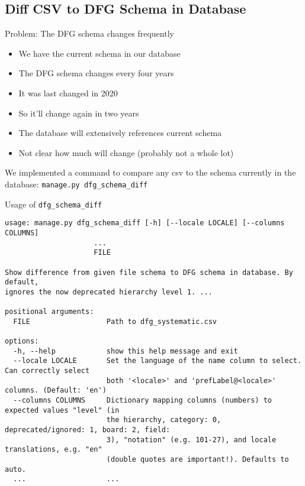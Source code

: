 \subsection{Diff CSV to DFG Schema in Database}

\begin{frame}[c]{Problem: The DFG schema changes frequently}
    \large
    \begin{itemize}[<+(1)->]
        \item We have the current schema in our database
        \item The DFG schema changes every four years
        \item It was last changed in 2020
        \item So it'll change again in two years
        \item The database will extensively references current schema
        \item Not clear how much will change (probably not a whole lot)
    \end{itemize}
    \pause
    We implemented a command to compare any csv to the schema currently in the
    database: \texttt{manage.py dfg_schema_diff}
\end{frame}


\begin{frame}[fragile]{Usage of \texttt{dfg\_schema\_diff}}
    \scriptsize
\begin{verbatim}
usage: manage.py dfg_schema_diff [-h] [--locale LOCALE] [--columns COLUMNS]
                     ...
                     FILE

Show difference from given file schema to DFG schema in database. By default,
ignores the now deprecated hierarchy level 1. ...

positional arguments:
  FILE                  Path to dfg_systematic.csv

options:
  -h, --help            show this help message and exit
  --locale LOCALE       Set the language of the name column to select. Can correctly select
                        both '<locale>' and 'prefLabel@<locale>' columns. (Default: 'en')
  --columns COLUMNS     Dictionary mapping columns (numbers) to expected values "level" (in
                        the hierarchy, category: 0, deprecated/ignored: 1, board: 2, field:
                        3), "notation" (e.g. 101-27), and locale translations, e.g. "en"
                        (double quotes are important!). Defaults to auto.
  ...                   ...
\end{verbatim}
\end{frame}


